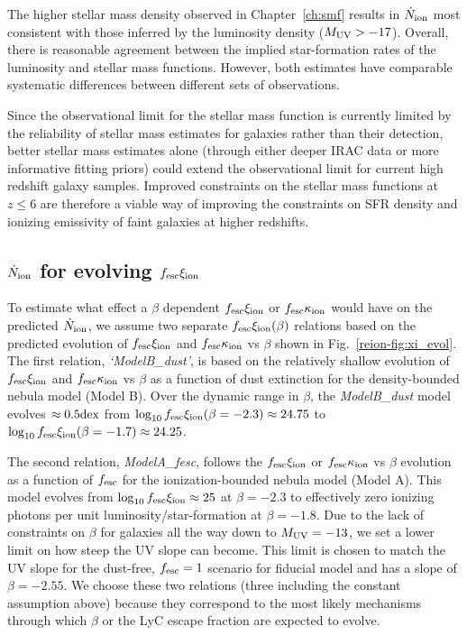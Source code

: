 The higher stellar mass density observed in Chapter~\ref{ch:smf} results in $\dot{N}_{\rm{ion}}$ most consistent with those inferred by the \citet{2015ApJ...803...34B} luminosity density ($M_{\rm{UV}} > -17$). Overall, there is reasonable agreement between the implied star-formation rates of the luminosity and stellar mass functions. However, both estimates have comparable systematic differences between different sets of observations.

Since the observational limit for the stellar mass function is currently limited by the reliability of stellar mass estimates for galaxies rather than their detection, better stellar mass estimates alone (through either deeper IRAC data or more informative fitting priors) could extend the observational limit for current high redshift galaxy samples. Improved constraints on the stellar mass functions at $z \leq 6$ are therefore a viable way of improving the constraints on SFR density and ionizing emissivity of faint galaxies at higher redshifts. 

\subsection{$\dot{N}_{\rm{ion}}$ for evolving $f_{\rm{esc}}\xi_{\rm{ion}}$}

To estimate what effect a $\beta$ dependent $f_{\rm{esc}}\xi_{\rm{ion}}$ or $f_{\rm{esc}}\kappa_{\rm{ion}}$ would have on the predicted $\dot{N}_{\rm{ion}}$, we assume two separate $f_{\rm{esc}}\xi_{\rm{ion}}(\beta)$ relations based on the predicted evolution of $f_{\rm{esc}}\xi_{\rm{ion}}$ and $f_{\rm{esc}}\kappa_{\rm{ion}}$ vs $\beta$ shown in Fig.~\ref{reion-fig:xi_evol}. The first relation,  \emph{`ModelB\_dust'}, is based on the relatively shallow evolution of $f_{\rm{esc}}\xi_{\rm{ion}}$ and $f_{\rm{esc}}\kappa_{\rm{ion}}$ vs $\beta$ as a function of dust extinction for the density-bounded nebula model (Model B). Over the dynamic range in $\beta$, the \emph{ModelB\_dust} model evolves $\approx 0.5\/\rm{dex}$ from $\log_{10}f_{\rm{esc}}\xi_{\rm{ion}}(\beta = -2.3) \approx 24.75$ to $\log_{10}f_{\rm{esc}}\xi_{\rm{ion}}(\beta = -1.7) \approx 24.25$. 

The second relation, \emph{ModelA\_fesc}, follows the $f_{\rm{esc}}\xi_{\rm{ion}}$ or $f_{\rm{esc}}\kappa_{\rm{ion}}$ vs $\beta$ evolution as a function of $f_{\rm{esc}}$ for the ionization-bounded nebula model (Model A). This model evolves from $\log_{10}f_{\rm{esc}}\xi_{\rm{ion}} \approx 25$ at $\beta = -2.3$ to effectively zero ionizing photons per unit luminosity/star-formation at $\beta = -1.8$. Due to the lack of constraints on $\beta$ for galaxies all the way down to $M_{\rm{UV}} = -13$, we set a lower limit on how steep the UV slope can become. This limit is chosen to match the UV slope for the dust-free, $f_{\rm{esc}} = 1$ scenario for fiducial model and has a slope of $\beta = -2.55$. We choose these two relations (three including the constant assumption above) because they correspond to the most likely mechanisms through which $\beta$ or the LyC escape fraction are expected to evolve.

